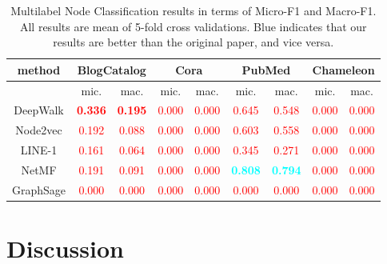 \documentclass[a4paper]{article}
\begin{document}
\begin{table}[H]
\centering
\begin{tabular}{|c|c|c|c|c|c|c|c|c|}
\hline
method & \multicolumn{2}{|c|}{BlogCatalog}& \multicolumn{2}{|c|}{Cora}& \multicolumn{2}{|c|}{PubMed} & \multicolumn{2}{|c|}{Chameleon}\\
\hline
& mic. & mac. &mic. & mac.& mic. & mac.& mic. & mac.\\
\hline
DeepWalk& \textcolor{red}{\textbf{0.336}}& \textcolor{red}{\textbf{0.195}}&\textcolor{red}{0.000}&\textcolor{red}{0.000}&\textcolor{red}{0.645}&\textcolor{red}{0.548}&\textcolor{red}{0.000}&\textcolor{red}{0.000}\\
Node2vec& \textcolor{red}{0.192}& \textcolor{red}{0.088}&\textcolor{red}{0.000}&\textcolor{red}{0.000}&\textcolor{red}{0.603}&\textcolor{red}{0.558}&\textcolor{red}{0.000}&\textcolor{red}{0.000}\\
LINE-1& \textcolor{red}{0.161}& \textcolor{red}{0.064}&\textcolor{red}{0.000}&\textcolor{red}{0.000}&\textcolor{red}{0.345}&\textcolor{red}{0.271}&\textcolor{red}{0.000}&\textcolor{red}{0.000}\\
NetMF& \textcolor{red}{0.191}& \textcolor{red}{0.091}&\textcolor{red}{0.000}&\textcolor{red}{0.000}& \textcolor{cyan}{\textbf{0.808}}&\textcolor{cyan}{\textbf{0.794}}&\textcolor{red}{0.000}&\textcolor{red}{0.000}\\
GraphSage& \textcolor{red}{0.000}& \textcolor{red}{0.000}&\textcolor{red}{0.000}&\textcolor{red}{0.000}&\textcolor{red}{0.000}&\textcolor{red}{0.000}&\textcolor{red}{0.000}&\textcolor{red}{0.000}\\
\hline
\end{tabular}
\caption{Multilabel Node Classification results in terms of Micro-F1 and Macro-F1. All results are mean of 5-fold cross validations. Blue indicates that our results are better than the original paper, and vice versa.}
\end{table}


\section{Discussion}

\end{document}
